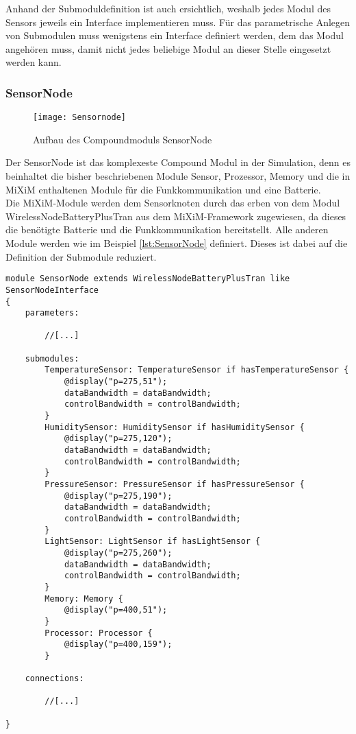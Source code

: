 Anhand der Submoduldefinition ist auch ersichtlich, weshalb jedes Modul des Sensors jeweils ein Interface implementieren muss. Für das parametrische Anlegen von Submodulen muss wenigstens ein Interface definiert werden, dem das Modul angehören muss, damit nicht jedes beliebige Modul an dieser Stelle eingesetzt werden kann.

\subsubsection{SensorNode}

\begin{figure}[htbp]
\centering
\caption{Aufbau des Compoundmoduls SensorNode}
\label{fig:Sensornode}
\texttt{[image: Sensornode]}
\end{figure}

Der SensorNode ist das komplexeste Compound Modul in der Simulation, denn es beinhaltet die bisher beschriebenen Module Sensor, Prozessor, Memory und die in MiXiM enthaltenen Module für die Funkkommunikation und eine Batterie.\\
Die MiXiM-Module werden dem Sensorknoten durch das erben von dem Modul WirelessNodeBatteryPlusTran aus dem MiXiM-Framework zugewiesen, da dieses die benötigte Batterie und die Funkkommunikation bereitstellt. Alle anderen Module werden wie im Beispiel \ref{lst:SensorNode} definiert. Dieses ist dabei auf die Definition der Submodule reduziert.

\begin{lstlisting}[language=ned,caption={SensorNode mit den neu definierten Modulen},label=lst:SensorNode]
module SensorNode extends WirelessNodeBatteryPlusTran like SensorNodeInterface
{
    parameters:
    
        //[...]

    submodules:
        TemperatureSensor: TemperatureSensor if hasTemperatureSensor {
            @display("p=275,51");
            dataBandwidth = dataBandwidth;
            controlBandwidth = controlBandwidth;
        }
        HumiditySensor: HumiditySensor if hasHumiditySensor {
            @display("p=275,120");
            dataBandwidth = dataBandwidth;
            controlBandwidth = controlBandwidth;
        }
        PressureSensor: PressureSensor if hasPressureSensor {
            @display("p=275,190");
            dataBandwidth = dataBandwidth;
            controlBandwidth = controlBandwidth;
        }
        LightSensor: LightSensor if hasLightSensor {
            @display("p=275,260");
            dataBandwidth = dataBandwidth;
            controlBandwidth = controlBandwidth;
        }
        Memory: Memory {
            @display("p=400,51");
        }
        Processor: Processor {
            @display("p=400,159");
        }
        
    connections:
    
        //[...]
        
}        
\end{lstlisting}

